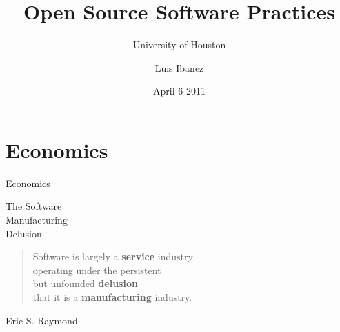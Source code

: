 \documentclass[18pt]{beamer}
\begin{document}
\title[Open Source]{Open Source Software Practices}
\subtitle[UH]{University of Houston}
\author[Luis Ibanez]{Luis Ibanez}
\date[April 2011]{April 6 2011}

\begin{frame}
\titlepage
\end{frame}

\begin{frame}
  \tableofcontents
\end{frame}


\section{Economics}

{
\begin{frame}[plain]
\fontsize{72pt}{90pt}\selectfont
\center
\begin{center}
Economics
\end{center}
\end{frame}
}

\begin{frame}[plain]
\fontsize{36pt}{36pt}\selectfont
\center
\begin{center}
The Software\\
Manufacturing\\
Delusion
\end{center}
\end{frame}

\begin{frame}[plain]
\fontsize{18pt}{18pt}\selectfont
\center
\begin{quote}
Software is largely a \textbf{service} industry\\
operating under the persistent\\
but unfounded \textbf{delusion}\\
that it is a \textbf{manufacturing} industry.\\
\end{quote}
\bigskip
\begin{flushright}
Eric S. Raymond
\end{flushright}
\end{frame}
\end{document}
